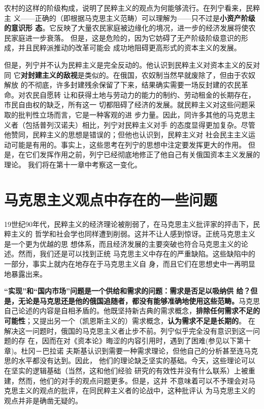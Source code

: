 农村的这样的阶级构成，说明了民粹主义的观点为何能够流行。在列宁看来，民粹主
义——正确的（即根据马克思主义范畴）可以理解为——只不过是\textbf{小资产阶级的意识形
  态}。它反映了大量农民家庭被边缘化的境况，进一步的经济发展将使农民家庭进一步衰落。
但是，这是危险的，因为它妨碍了无产阶级阶级意识的形成，并且民粹派推动的改革可能会
成功地阻碍更高形式的资本主义的发展。

但是，列宁并不认为民粹主义是完全反动的。他认识到民粹主义对资本主义的反对同
它\textbf{对封建主义的敌视}是类似的。在俄国，农奴制当然早就废除了，但由于农奴解放
的不彻底，许多封建残余保留了下来，结果确实需要一场反封建的农民革命。对农民自愿转
让和获得土地与劳动力的能力的制约、劳动租金的长期存在，市民自由权的缺乏，所有这一
切都阻碍了经济的发展。就民粹主义对这些问题采取的批判性立场而言，它是一种客观的进
步力量。因此，同许多其他的马克思主义者（包括普列汉诺夫）相比，列宁对民粹主义对手
的态度显得更加复杂。尽管他赞同，民粹主义的思想是错误的；但他也认识到，民粹主义对
社会民主主义运动可能是有用的。事实上，这些思考在列宁的思想中注定要发挥更大的作用。
但是，在它们发挥作用之前，列宁已经彻底地修正了他自己有关俄国资本主义发展的理论。
我们将在第十一章中考察这一变化。

\section{马克思主义观点中存在的一些问题}
19世纪90年代，民粹主义的经济理论被削弱了，在马克思主义批评家的抨击下，民粹主义的
哲学和社会学也同样遭到削弱。这并不让人感到惊讶。正统马克思主义是一个更为优越的思
想体系，而且经济发展的主要突破也符合马克思主义的论述。然而，我们还是可以找到正统
马克思主义中存在的严重缺陷。这些缺陷中的一部分，事实上就内在地存在于马克思主义自
身，而且它们在思想史中一再明显地暴露出来。

\textbf{“实现”和“国内市场”问题是一个供给和需求的问题：需求是否足以吸纳供
  给？但是，无论是马克思还是他的俄国追随者，都没有能够准确地使用这些范畴。}马克思
自己论述的内容是自相矛盾的。他既坚持新古典的需求概念，\textbf{排除任何需求不足的
  可能性}；又提出另一个（凯恩斯主义的）需求概念，\textbf{认为需求不足是长期的}。
在解决这一问题时，俄国的马克思主义者止步不前。列宁似乎完全没有意识到这一问题的存
在，因而在对《资本论》晦涩的内容引用时，遇到了困难(参见以下第十章)。杜冈－巴拉诺
夫斯基认识到需要一种需求理论，但他自己的分析甚至连马克思的水平都没有达到。因此，
他们的理论缺乏坚实的基础。今天，这些理论可以在坚实的逻辑基础（当然，这和他们经验
研究的有效性并没有什么联系）上被重建，然而，他们的对手的观点问题更多。但是，这并
不意味着可以不予理会对马克思主义的观点的批评，在同民粹主义者的论战中，这种批评认
为马克思主义的观点并非是确凿无疑的。

